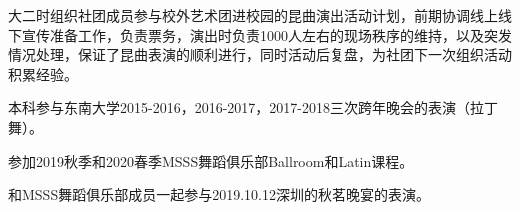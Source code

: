 \vspace{-4.0mm}

\begin{cventries}
\cvpapers
{
    \begin{cvitems}
    \item {大二时组织社团成员参与校外艺术团进校园的昆曲演出活动计划，前期协调线上线下宣传准备工作，负责票务，演出时负责1000人左右的现场秩序的维持，以及突发情况处理，保证了昆曲表演的顺利进行，同时活动后复盘，为社团下一次组织活动积累经验。}
    \item {本科参与东南大学2015-2016，2016-2017，2017-2018三次跨年晚会的表演（拉丁舞）。}
    \item {参加2019秋季和2020春季MSSS舞蹈俱乐部Ballroom和Latin课程。}
    \item {和MSSS舞蹈俱乐部成员一起参与2019.10.12深圳的秋茗晚宴的表演。}
    \end{cvitems}
}
\end{cventries}